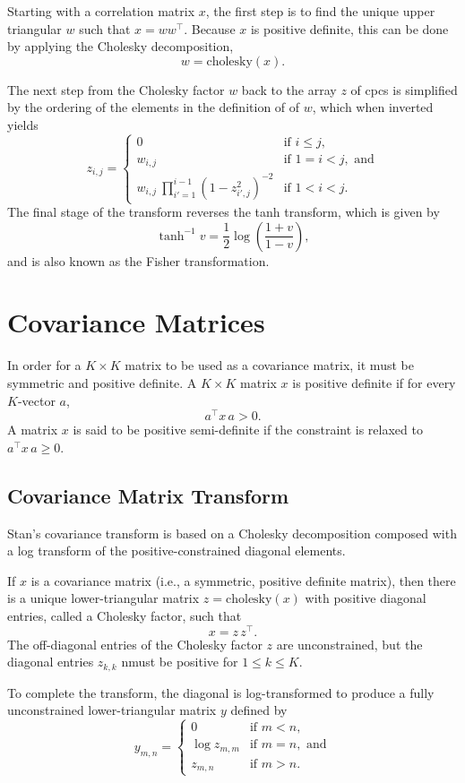 \documentclass[10pt]{report}
\newcommand{\Stan}{Stan\xspace}
\newcommand{\acronym}[1]{{\sc #1}\xspace}
\newcommand{\CPC}{\acronym{cpc}}
\begin{document}
Starting with a correlation matrix $x$, the first step is to find the
unique upper triangular $w$ such that $x = w w^{\top}$.  Because $x$
is positive definite, this can be done by applying the Cholesky
decomposition,
\[
w = \mbox{cholesky}(x).
\]


The next step from the Cholesky factor $w$ back to the array $z$ of
{\CPC}s is simplified by the ordering of the elements in the
definition of of $w$, which when inverted yields
%
\[
z_{i,j} =
\left\{
\begin{array}{cl}
0 & \mbox{if } i \leq j,
\\[8pt]
w_{i,j} & \mbox{if } 1 = i < j, \mbox{ and}
\\[8pt]
{w_{i,j}}
\
\prod_{i'=1}^{i-1} \left( 1 - z_{i'\!,j}^2 \right)^{-2}
& \mbox{if } 1 < i < j.
\end{array}
\right.
\]
The final stage of the transform reverses the tanh transform, which
is given by
\[
\tanh^{-1} v = \frac{1}{2} \log \left( \frac{1 + v}{1 - v} \right),
\]
and is also known as the Fisher transformation.


\section{Covariance Matrices}

In order for a $K \times K$ matrix to be used as a covariance matrix,
it must be symmetric and positive definite.  A $K \times K$ matrix $x$ 
is positive definite if for every $K$-vector $a$,
%
\[
a^{\top} x \,  a > 0.
\]
%
A matrix $x$ is said to be positive semi-definite if the constraint
is relaxed to $a^{\top} x \, a \geq 0$.

\subsection{Covariance Matrix Transform}

\Stan's covariance transform is based on a Cholesky decomposition
composed with a log transform of the positive-constrained diagonal
elements.  

If $x$ is a covariance matrix (i.e., a symmetric, positive definite
matrix), then there is a unique lower-triangular matrix $z =
\mbox{cholesky}(x)$ with positive diagonal entries, called a Cholesky
factor, such that
\[
x = z \, z^{\top}.
\]
The off-diagonal entries of the Cholesky factor $z$ are unconstrained,
but the diagonal entries $z_{k,k}$ nmust be positive for $1 \leq k
\leq K$.

To complete the transform, the diagonal is log-transformed to produce
a fully unconstrained lower-triangular matrix $y$ defined by
\[
y_{m,n} = 
\left\{
\begin{array}{cl}
0 & \mbox{if } m < n,
\\[4pt]
\log z_{m,m} & \mbox{if } m = n, \mbox{ and}
\\[4pt]
z_{m,n} & \mbox{if } m > n.
\end{array}
\right.
\]
\end{document}
